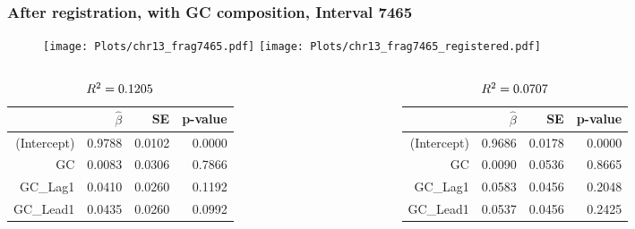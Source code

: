 \documentclass[10pt,dvipsnames,table]{beamer}
\begin{document}
\begin{frame}
\frametitle{After registration, with GC composition, Interval 7465}
\begin{figure}[t]
\texttt{[image: Plots/chr13\_frag7465.pdf]}
\hspace{0.5cm}
\texttt{[image: Plots/chr13\_frag7465\_registered.pdf]}
\end{figure}

\vspace{-0.5cm}
\begin{columns}
\begin{column}{0.5\textwidth}
\begin{table}[ht]
\centering
{\footnotesize{
\begin{tabular}{rrrr}
  \hline
  & $\hat{\beta}$ & SE & p-value \\ 
  \hline
  (Intercept) & 0.9788 & 0.0102 & 0.0000 \\ 
  GC & 0.0083 & 0.0306 & 0.7866 \\ 
  GC\_Lag1 & 0.0410 & 0.0260 & 0.1192 \\ 
  GC\_Lead1 & 0.0435 & 0.0260 &  0.0992 \\ 
  \hline
\end{tabular}
\caption{$\tiny{R^2 = 0.1205}$}
}}
\end{table}
\end{column}

\begin{column}{0.5\textwidth}
\begin{table}[ht]
\centering
{\footnotesize{
\begin{tabular}{rrrr}
  \hline
  & $\hat{\beta}$ & SE & p-value \\ 
  \hline
  (Intercept) & 0.9686 & 0.0178 & 0.0000 \\ 
  GC & 0.0090 & 0.0536 & 0.8665 \\ 
  GC\_Lag1 & 0.0583 & 0.0456 & 0.2048 \\ 
  GC\_Lead1 & 0.0537 & 0.0456 & 0.2425 \\ 
  \hline
\end{tabular}
\caption{$\tiny{R^2 = 0.0707}$}
}}
\end{table}
\end{column}

\end{columns}

\end{frame}
\end{document}
